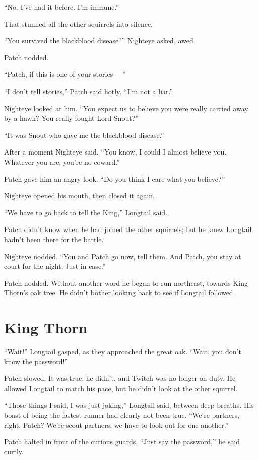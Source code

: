 \documentclass[12pt]{memoir}
\begin{document}
“No. I’ve had it before. I’m immune.”

That stunned all the other squirrels into silence.

“You survived the blackblood disease?” Nighteye asked, awed.

Patch nodded.

“Patch, if this is one of your stories —”

“I don’t tell stories,” Patch said hotly. “I’m not a liar.”

Nighteye looked at him. “You expect us to believe you were really
carried away by a hawk? You really fought Lord Snout?”

“It was Snout who gave me the blackblood disease.”

After a moment Nighteye said, “You know, I could I almost believe
you. Whatever you are, you’re no coward.”

Patch gave him an angry look. “Do you think I care what you believe?”

Nighteye opened his mouth, then closed it again.

“We have to go back to tell the King,” Longtail said.

Patch didn’t know when he had joined the other squirrels; but he knew
Longtail hadn’t been there for the battle.

Nighteye nodded. “You and Patch go now, tell them. And Patch, you stay
at court for the night. Just in case.”

Patch nodded. Without another word he began to run northeast, towards
King Thorn’s oak tree. He didn’t bother looking back to see if
Longtail followed.


\section{King Thorn}

“Wait!” Longtail gasped, as they approached the great oak. “Wait, you
don’t know the password!”

Patch slowed. It was true, he didn’t, and Twitch was no longer on
duty. He allowed Longtail to match his pace, but he didn’t look at the
other squirrel.

“Those things I said, I was just joking,” Longtail said, between deep
breaths. His boast of being the fastest runner had clearly not been
true. “We’re partners, right, Patch? We’re scout partners, we have to
look out for one another.”

Patch halted in front of the curious guards. “Just say the password,”
he said curtly.
\end{document}
